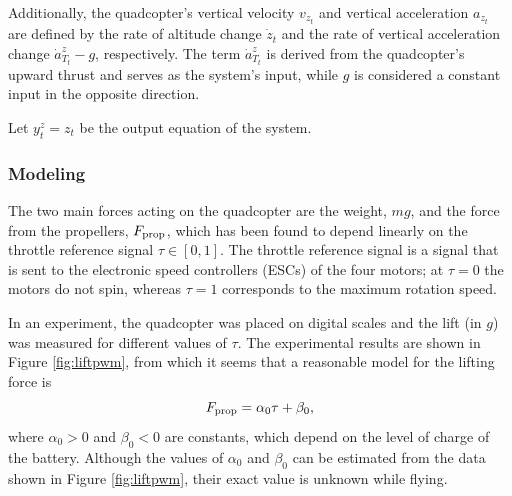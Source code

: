 \documentclass{article}
\begin{document}
Additionally, the quadcopter's vertical velocity \( v_{z_t} \) and vertical acceleration \( a_{z_t} \) are defined by the rate of altitude change \( \dot{z}_t \) and the rate of vertical acceleration change \( \dot{a}^z_{T_t} - g \), respectively. The term \( \dot{a}^z_{T_t} \) is derived from the quadcopter's upward thrust and serves as the system's input, while \( g \) is considered a constant input in the opposite direction.

Let \( y_{t}^z = z_t \) be the output equation of the system. 
\subsubsection*{Modeling}
  The two main forces acting on the quadcopter are the weight, $mg$,
  and the force from the propellers, $F_{\rm prop}$, which has been
  found to depend linearly on the throttle reference signal $\tau\in[0,1]$.
  The throttle reference signal is a signal that is sent to the
  electronic speed controllers (ESCs) of the four motors; at $\tau=0$
  the motors do not spin, whereas $\tau=1$ corresponds to the maximum
  rotation speed.
  
  In an experiment, the quadcopter was placed on digital scales and the
  lift (in $\unit{g}$) was measured for different values of $\tau$.
  The experimental results are shown in Figure \ref{fig:liftpwm}, from
  which it seems that a reasonable model for the lifting force is
  \begin{equation}
    F_{\rm prop} = \alpha_0 \tau + \beta_0,
    \label{eq:Fprop}
  \end{equation}
  where $\alpha_0>0$ and $\beta_0<0$ are constants, which depend on the level of
  charge of the battery. Although the values of $\alpha_0$ and $\beta_0$ can be
  estimated from the data shown in Figure \ref{fig:liftpwm}, their exact
  value is unknown while flying.
  
\end{document}
